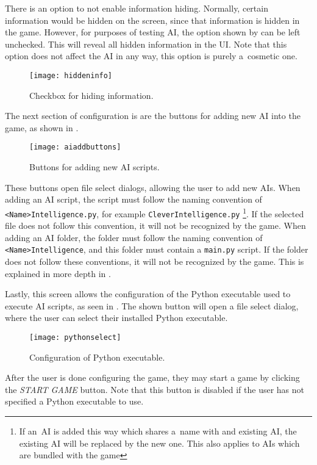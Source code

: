 There is an option to not enable information hiding. Normally, certain information
would be hidden on the screen, since that information is hidden in the game.
However, for purposes of testing AI, the option shown by  can
be left unchecked. This will reveal all hidden information in the UI.
Note that this option does not affect the AI in any way, this option
is purely a~cosmetic one.

\begin{figure}[ht]
\centerline{\mbox{\texttt{[image: hiddeninfo]}}}
\caption{Checkbox for hiding information.}\label{ud:hiddeninfo}
\end{figure}

The next section of configuration is are the buttons for adding new AI
into the game, as shown in .

\begin{figure}[ht]
\centerline{\mbox{\texttt{[image: aiaddbuttons]}}}
\caption{Buttons for adding new AI scripts.}\label{ud:aiaddbuttons}
\end{figure}

These buttons open file select dialogs, allowing the user to add new AIs.
When adding an AI script, the script must follow the naming convention
of \texttt{<Name>Intelligence.py}, for example \texttt{CleverIntelligence.py}
\footnote{If an~AI is added this way which shares a~name with and existing AI,
the existing AI will be replaced by the new one. This also applies to AIs which
are bundled with the game}.
If the selected file does not follow this convention, it will not be recognized
by the game.
When adding an AI folder, the folder must follow the naming convention of
\texttt{<Name>Intelligence}, and this folder must contain a \texttt{main.py}
script. If the folder does not follow these conventions, it will not be recognized
by the game. This is explained in more depth in .

Lastly, this screen allows the configuration of the Python executable used
to execute AI scripts, as seen in . The shown
button will open a file select dialog, where the user can select their
installed Python executable.

\begin{figure}[ht]
\centerline{\mbox{\texttt{[image: pythonselect]}}}
\caption{Configuration of Python executable.}\label{ud:pythonselect}
\end{figure}

After the user is done configuring the game, they may start a game by clicking the
\emph{START GAME} button. Note that this button is disabled if the user
has not specified a Python executable to use.

